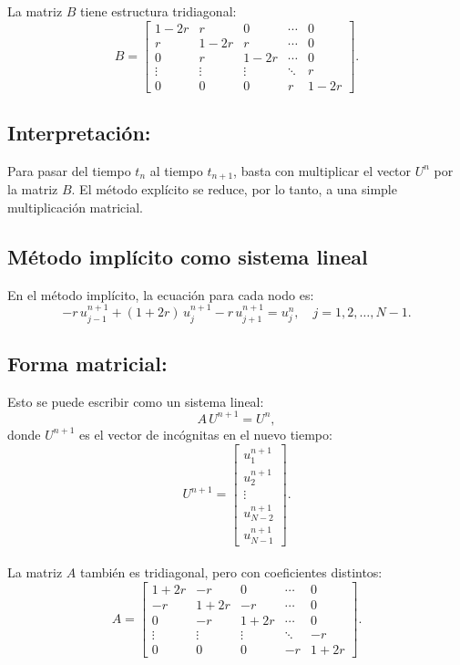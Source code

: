 \documentclass[12pt,a4paper]{article}
\begin{document}
La matriz \(B\) tiene estructura tridiagonal:
\[
B = 
\begin{bmatrix}
1-2r & r     & 0     & \cdots & 0 \\[4pt]
r     & 1-2r & r     & \cdots & 0 \\[4pt]
0     & r     & 1-2r & \cdots & 0 \\[4pt]
\vdots& \vdots& \vdots& \ddots & r \\[4pt]
0     & 0     & 0     & r      & 1-2r
\end{bmatrix}.
\]

\subsection*{Interpretación:}
Para pasar del tiempo \(t_n\) al tiempo \(t_{n+1}\), basta con multiplicar el vector \(U^n\) por la matriz \(B\).  
El método explícito se reduce, por lo tanto, a una simple multiplicación matricial.

\subsection{Método implícito como sistema lineal}

En el método implícito, la ecuación para cada nodo es:
\[
-r\,u_{j-1}^{n+1} + (1+2r)\,u_j^{n+1} - r\,u_{j+1}^{n+1} = u_j^n,
\quad j = 1, 2, \dots, N-1.
\]

\subsection*{Forma matricial:} 
Esto se puede escribir como un sistema lineal:
\[
A\,U^{n+1} = U^n,
\]
donde \(U^{n+1}\) es el vector de incógnitas en el nuevo tiempo:
\[
U^{n+1} = 
\begin{bmatrix}
u_1^{n+1} \\[4pt] u_2^{n+1} \\[4pt] \vdots \\[4pt] u_{N-2}^{n+1} \\[4pt] u_{N-1}^{n+1}
\end{bmatrix}.
\] \\

La matriz \(A\) también es tridiagonal, pero con coeficientes distintos:
\[
A = 
\begin{bmatrix}
1+2r & -r    & 0     & \cdots & 0 \\[4pt]
-r    & 1+2r & -r    & \cdots & 0 \\[4pt]
0     & -r    & 1+2r & \cdots & 0 \\[4pt]
\vdots& \vdots& \vdots& \ddots & -r \\[4pt]
0     & 0     & 0     & -r     & 1+2r
\end{bmatrix}.
\]
\end{document}
